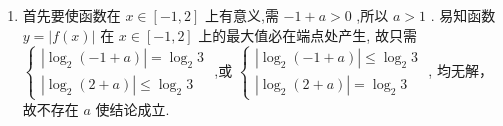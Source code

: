 \begin{enumerate}
\begin{jieda}
\begin{enumerate}
            可化为 ${\left( t + 2\right) }^{2} > {mt}$ 在 $\left( {0, + \infty }\right)$ 上恒成立,
            分离参数得 $m < \dfrac{{t}^{2} + {4t} + 4}{t} = t + \dfrac{4}{t} + 4$ ,因为 $t + \dfrac{4}{t} \geq  2\sqrt{t \cdot  \dfrac{4}{t}} = 4$ ,当且仅当 $t = 2$ 时取等号,
            则要使原式恒成立,只需 $m < 4 + 4 = 8$ 即可,即实数 $m$ 的取值范围为 $\left( {-\infty ,8}\right)$
            \item 首先要使函数在 $x \in  \left\lbrack  {-1,2}\right\rbrack$ 上有意义,需 $- 1 + a > 0$ ,所以 $a > 1$ .
            易知函数 $y = \left| {f\left( x\right) }\right|$ 在 $x \in  \left\lbrack  {-1,2}\right\rbrack$ 上的最大值必在端点处产生,
            故只需 $\left\{  \begin{array}{l} \left| {{\log }_{2}\left( {-1 + a}\right) }\right|  = {\log }_{2}3 \\  \left| {{\log }_{2}\left( {2 + a}\right) }\right|  \leq  {\log }_{2}3 \end{array}\right.$ ,或 $\left\{  \begin{array}{l} \left| {{\log }_{2}\left( {-1 + a}\right) }\right|  \leq  {\log }_{2}3 \\  \left| {{\log }_{2}\left( {2 + a}\right) }\right|  = {\log }_{2}3 \end{array}\right.$ ,
            均无解，故不存在 $a$ 使结论成立.
        \end{enumerate}
    \end{jieda} 
\end{enumerate}
\newpage
\quad
\newpage